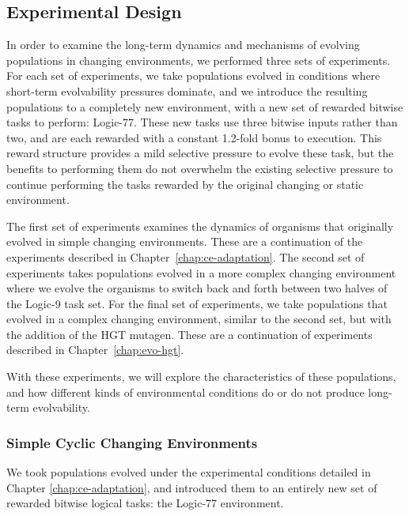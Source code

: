 \documentclass[PhD]{msu-thesis}
\begin{document}
\subsection{Experimental Design}
In order to examine the long-term dynamics and mechanisms of evolving populations in changing environments, we performed three sets of experiments. For each set of experiments, we take populations evolved in conditions where short-term evolvability pressures dominate, and we introduce the resulting populations to a completely new environment, with a new set of rewarded bitwise tasks to perform: Logic-77. These new tasks use three bitwise inputs rather than two, and are each rewarded with a constant 1.2-fold bonus to execution. This reward structure provides a mild selective pressure to evolve these task, but the benefits to performing them do not overwhelm the existing selective pressure to continue performing the tasks rewarded by the original changing or static environment. 

The first set of experiments examines the dynamics of organisms that originally evolved in simple changing environments. These are a continuation of the experiments described in Chapter~\ref{chap:ce-adaptation}. The second set of experiments takes populations evolved in a more complex changing environment where we evolve the organisms to switch back and forth between two halves of the Logic-9 task set. For the final set of experiments, we take populations that evolved in a complex changing environment, similar to the second set, but with the addition of the HGT mutagen. These are a continuation of experiments described in Chapter~\ref{chap:evo-hgt}.

With these experiments, we will explore the characteristics of these populations, and how different kinds of environmental conditions do or do not produce long-term evolvability.  

\subsubsection{Simple Cyclic Changing Environments}
We took populations evolved under the experimental conditions detailed in Chapter \ref{chap:ce-adaptation}, and introduced them to an entirely new set of rewarded bitwise logical tasks: the Logic-77 environment. 

\end{document}

